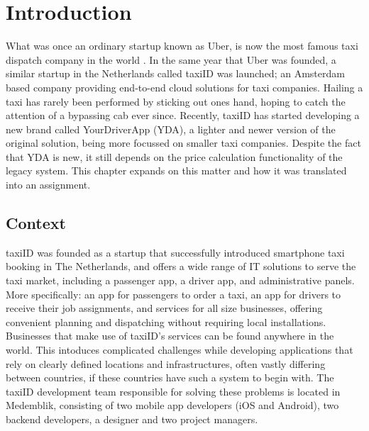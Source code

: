 \graphicspath{{Chapter1/Figs/Vector/}{Chapter1/Figs/}}

%
\chapter{Introduction}
What was once an ordinary startup known as Uber, is now the most famous taxi dispatch company in the world \cite{Uber}. In the same year that Uber was founded, a similar startup in the Netherlands called taxiID was launched; an Amsterdam based company providing end-to-end cloud solutions for taxi companies. Hailing a taxi has rarely been performed by sticking out ones hand, hoping to catch the attention of a bypassing cab ever since. Recently, taxiID has started developing a new brand called YourDriverApp (YDA), a lighter and newer version of the original solution, being more focussed on smaller taxi companies. Despite the fact that YDA is new, it still depends on the price calculation functionality of the legacy system. This chapter expands on this matter and how it was translated into an assignment.

%
\section{Context}
taxiID was founded as a startup that successfully introduced smartphone taxi booking in The Netherlands, and offers a wide range of IT solutions to serve the taxi market, including a passenger app, a driver app, and administrative panels. More specifically: an app for passengers to order a taxi, an app for drivers to receive their job assignments, and services  for all size businesses, offering convenient planning and dispatching without requiring local installations.
Businesses that make use of taxiID's services can be found anywhere in the world. This intoduces complicated challenges while developing applications that rely on clearly defined locations and infrastructures, often vastly differing between countries, if these countries have such a system to begin with.
The taxiID development team responsible for solving these problems is located in Medemblik, consisting of two mobile app developers (iOS and Android), two backend developers, a designer and two project managers.

